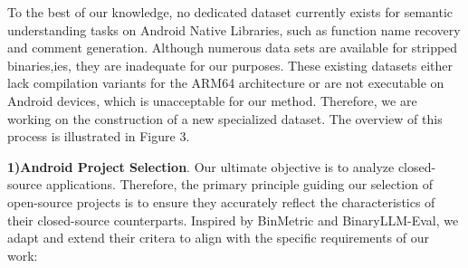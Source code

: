 \documentclass[acmsmall,screen,review,anonymous]{acmart} %
\begin{document}
To the best of our knowledge, no dedicated dataset currently exists for semantic understanding tasks on Android Native Libraries, such as function name recovery and comment generation. Although numerous data sets are available for stripped binaries,ies, they are inadequate for our purposes. These existing datasets either lack compilation variants for the ARM64 architecture or are not executable on Android devices, which is unacceptable for our method. Therefore, we are working on the construction of a new specialized dataset. The overview of this process is illustrated in Figure 3.

\textbf{1)Android Project Selection}. Our ultimate objective is to analyze closed-source applications. Therefore, the primary principle guiding our selection of open-source projects is to ensure they accurately reflect the characteristics of their closed-source counterparts. Inspired by BinMetric and BinaryLLM-Eval, we adapt and extend their critera to align with the specific requirements of our work:
\end{document}
